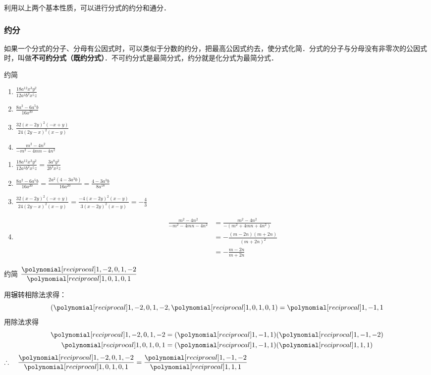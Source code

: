利用以上两个基本性质，可以进行分式的约分和通分．

\subsubsection{约分}

如果一个分式的分子、分母有公因式时，可以类似于分数的约分，把最高公因式约去，使分式化简．分式的分子与分母没有非零次的公因式时，叫做\textbf{不可约分式（既约分式）}．不可约分式是最简分式，约分就是化分式为最简分式．

\begin{example}
    约简
\begin{enumerate}
    \item $\frac{18 a^{12} x^{3} y^{2}}{12 a^{3} b^{2} x^{5} z}$
    \item $\frac{8 a^{2}-6 a^{5} b}{16 a^{20}}$
    \item $\frac{32(x-2 y)^{2}(-x+y)}{24(2 y-x)^{2}(x-y)}$
    \item $\frac{m^{2}-4 n^{2}}{-m^{2}-4 m n-4 n^{2}}$
\end{enumerate}
\end{example}

\begin{solution}
\begin{enumerate}
    \item $\frac{18 a^{12} x^{3} y^{2}}{12 a^{3} b^{2} x^{5} z}=\frac{3 a^{8} y^{2}}{2 b^{3} x^{2} z}$
    \item $\frac{8 a^{2}-6 a^{5} b}{16 a^{20}}  =\frac{2 a^{2}\left(4-3 a^{3} b\right)}{16 a^{20}} = \frac{4-3 a^{3} b}{8 a^{18}} $
    \item $ \frac{32(x-2 y)^{2}(-x+y)}{24(2 y-x)^{2}(x-y)}  =\frac{-4(x-2 y)^{2}(x-y)}{3(x-2 y)^{2}(x-y)}=-\frac{4}{3}$
    \item \[\begin{split}
        \frac{m^{2}-4 n^{2}}{-m^{2}-4 m n-4 n^{2}} &=
    \frac{m^{2}-4 n^{2}}{-\left(m^{2}+4 m n+4 n^{2}\right)}\\&=-\frac{(m-2n)(m+2n)}{(m+2n)^2}\\&=-\frac{m-2n}{m+2n}
    \end{split} \]
\end{enumerate}
\end{solution}

\begin{example}
    约简 $\frac{\poly{1,-2,0,1,-2}}{\poly{1,0,1,0,1}}$
\end{example}

\begin{solution}
    用辗转相除法求得：
\[(\poly{1,-2,0,1,-2}, \poly{1,0,1,0,1})=\poly{1,-1,1}\]
用除法求得
\[\begin{split}
    \poly{1,-2,0,1,-2}&=(\poly{1,-1,1})(\poly{1,-1,-2})\\
    \poly{1,0,1,0,1}&=(\poly{1,-1,1})(\poly{1,1,1})
\end{split}\]
$\therefore\quad \frac{\poly{1,-2,0,1,-2}}{\poly{1,0,1,0,1}}=\frac{\poly{1,-1,-2}}{\poly{1,1,1}}$
\end{solution}

